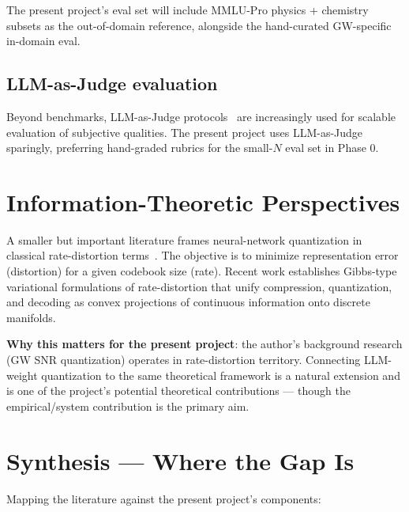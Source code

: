 \documentclass[11pt]{article}
\begin{document}
The present project's eval set will include MMLU-Pro physics + chemistry subsets as the out-of-domain reference, alongside the hand-curated GW-specific in-domain eval.

\subsection{LLM-as-Judge evaluation}

Beyond benchmarks, LLM-as-Judge protocols~\cite{zheng2023llmjudge} are increasingly used for scalable evaluation of subjective qualities. The present project uses LLM-as-Judge sparingly, preferring hand-graded rubrics for the small-$N$ eval set in Phase 0.

\section{Information-Theoretic Perspectives}

A smaller but important literature frames neural-network quantization in classical rate-distortion terms~\cite{informationbottleneck2020}. The objective is to minimize representation error (distortion) for a given codebook size (rate). Recent work establishes Gibbs-type variational formulations of rate-distortion that unify compression, quantization, and decoding as convex projections of continuous information onto discrete manifolds.

\textbf{Why this matters for the present project}: the author's background research (GW SNR quantization) operates in rate-distortion territory. Connecting LLM-weight quantization to the same theoretical framework is a natural extension and is one of the project's potential theoretical contributions --- though the empirical/system contribution is the primary aim.

\section{Synthesis --- Where the Gap Is}

Mapping the literature against the present project's components:
\end{document}
